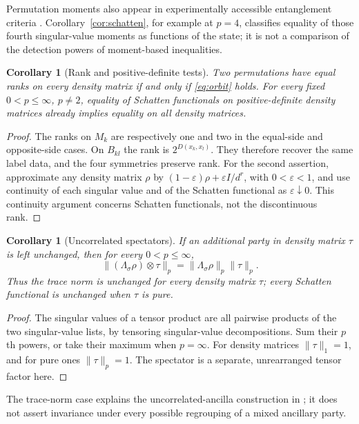 \documentclass[11pt]{article}
\newtheorem{corollary}[theorem]{Corollary}
\newcommand{\norm}[1]{\lVert #1\rVert}
\begin{document}
Permutation moments also appear in experimentally accessible
entanglement criteria \cite{Liu}. Corollary~\ref{cor:schatten}, for
example at $p=4$, classifies equality of those fourth singular-value
moments as functions of the state; it is not a comparison of the
detection powers of moment-based inequalities.

\begin{corollary}[Rank and positive-definite tests]\label{cor:rank}
Two permutations have equal ranks on every density matrix if and only
if \eqref{eq:orbit} holds. For every fixed $0<p\leq\infty$, $p\ne2$,
equality of Schatten functionals on positive-definite density matrices
already implies equality on all density matrices.
\end{corollary}
\begin{proof}
The ranks on $M_k$ are respectively one and two in the equal-side
and opposite-side cases. On $B_{kl}$ the rank is $2^{D(x_k,x_l)}$.
They therefore recover the same label data, and the four symmetries
preserve rank. For the second assertion, approximate any density matrix
$\rho$ by $(1-\varepsilon)\rho+\varepsilon I/d^r$, with
$0<\varepsilon<1$, and use continuity of each singular value and of
the Schatten functional as $\varepsilon\downarrow0$. This continuity
argument concerns Schatten functionals, not the discontinuous rank.
\end{proof}

\begin{corollary}[Uncorrelated spectators]\label{cor:spectators}
If an additional party in density matrix $\tau$ is left unchanged,
then for every $0<p\leq\infty$,
\[
 \norm{(\Lambda_\sigma\rho)\otimes\tau}_p
   =\norm{\Lambda_\sigma\rho}_p\norm{\tau}_p.
\]
Thus the trace norm is unchanged for every density matrix $\tau$;
every Schatten functional is unchanged when $\tau$ is pure.
\end{corollary}
\begin{proof}
The singular values of a tensor product are all pairwise products of
the two singular-value lists, by tensoring singular-value decompositions.
Sum their $p$th powers, or take their maximum when $p=\infty$.
For density matrices $\norm\tau_1=1$, and for pure ones $\norm\tau_p=1$.
The spectator is a separate, unrearranged tensor factor here.
\end{proof}
The trace-norm case explains the uncorrelated-ancilla construction in
\cite[Sections IV.B--C]{CW}; it does not assert invariance under every
possible regrouping of a mixed ancillary party.
\end{document}
